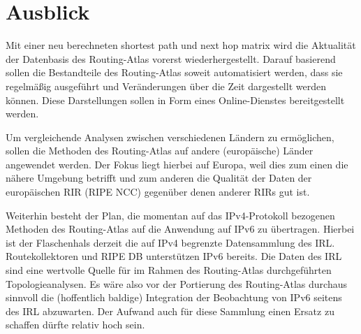 \section{Ausblick}\label{sec:ausblick}

Mit einer neu berechneten shortest path und next hop matrix wird die Aktualität der Datenbasis des Routing-Atlas vorerst wiederhergestellt.
Darauf basierend sollen die Bestandteile des Routing-Atlas soweit automatisiert werden, dass sie regelmäßig ausgeführt und Veränderungen über die Zeit dargestellt werden können.
Diese Darstellungen sollen in Form eines Online-Dienstes bereitgestellt werden.

Um vergleichende Analysen zwischen verschiedenen Ländern zu ermöglichen, sollen die Methoden des Routing-Atlas auf andere (europäische) Länder angewendet werden.
Der Fokus liegt hierbei auf Europa, weil dies zum einen die nähere Umgebung betrifft und zum anderen die Qualität der Daten der europäischen RIR (RIPE NCC) gegenüber denen anderer RIRs gut ist.

Weiterhin besteht der Plan, die momentan auf das IPv4-Protokoll bezogenen Methoden des Routing-Atlas auf die Anwendung auf IPv6 zu übertragen.
Hierbei ist der Flaschenhals derzeit die auf IPv4 begrenzte Datensammlung des IRL.
Routekollektoren und RIPE DB unterstützen IPv6 bereits.
Die Daten des IRL sind eine wertvolle Quelle für im Rahmen des Routing-Atlas durchgeführten Topologieanalysen.
Es wäre also vor der Portierung des Routing-Atlas durchaus sinnvoll die (hoffentlich baldige) Integration der Beobachtung von IPv6 seitens des IRL abzuwarten.
Der Aufwand auch für diese Sammlung einen Ersatz zu schaffen dürfte relativ hoch sein.

